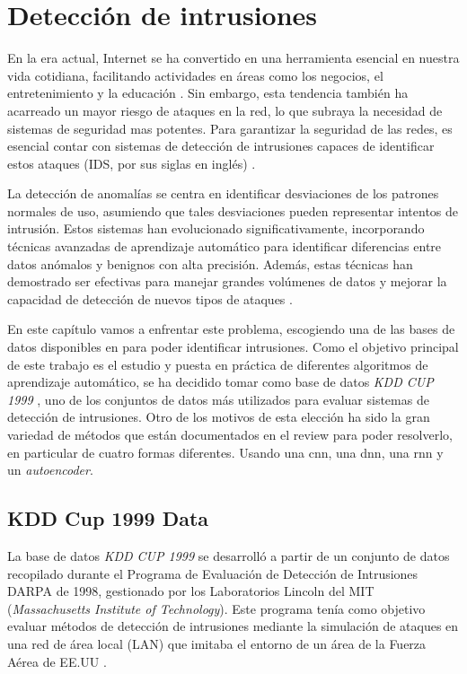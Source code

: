 \chapter{Detección de intrusiones} \label{Capitulo4}

En la era actual, Internet se ha convertido en una herramienta esencial en nuestra vida cotidiana, facilitando actividades en áreas como los negocios, el entretenimiento y la educación \citep{tsai2009intrusion}. Sin embargo, esta tendencia también ha acarreado un mayor riesgo de ataques en la red, lo que subraya la necesidad de sistemas de seguridad mas potentes. Para garantizar la seguridad de las redes, es esencial contar con sistemas de detección de intrusiones capaces de identificar estos ataques (IDS, por sus siglas en inglés) \citep{liu2019machine}.


La detección de anomalías se centra en identificar desviaciones de los patrones normales de uso, asumiendo que tales desviaciones pueden representar intentos de intrusión. Estos sistemas han evolucionado significativamente, incorporando técnicas avanzadas de aprendizaje automático para identificar diferencias entre datos anómalos y benignos con alta precisión. Además, estas técnicas han demostrado ser efectivas para manejar grandes volúmenes de datos y mejorar la capacidad de detección de nuevos tipos de ataques \citep{liu2019machine}.

En este capítulo vamos a enfrentar este problema, escogiendo una de las bases de datos disponibles en \citep{podder2021artificial} para poder identificar intrusiones. Como el objetivo principal de este trabajo es el estudio y puesta en práctica de diferentes algoritmos de aprendizaje automático, se ha decidido tomar como base de datos \textit{KDD CUP 1999} \citep{kddcup99}, uno de los conjuntos de datos más utilizados para evaluar sistemas de detección de intrusiones. Otro de los motivos de esta elección ha sido la gran variedad de métodos que están documentados en el review para poder resolverlo, en particular de cuatro formas diferentes. Usando una \acrfull{cnn}, una \acrfull{dnn}, una \acrfull{rnn} y un \textit{autoencoder}. 




\section{KDD Cup 1999 Data}

La base de datos\textit{ KDD CUP 1999} se desarrolló a partir de un conjunto de datos recopilado durante el Programa de Evaluación de Detección de Intrusiones DARPA de 1998, gestionado por los Laboratorios Lincoln del MIT (\textit{Massachusetts Institute of Technology}). Este programa tenía como objetivo evaluar métodos de detección de intrusiones mediante la simulación de ataques en una red de área local (LAN) que imitaba el entorno de un área de la Fuerza Aérea de EE.UU \citep{kddcup99}.

